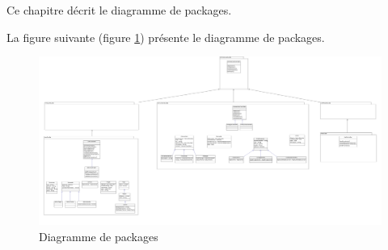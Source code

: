Ce chapitre décrit le diagramme de packages.

La figure suivante (figure \ref{diagrammePackages}) présente le diagramme de packages.
\begin{figure}[H]
	\centering
	\includegraphics[scale=0.12]{images/diagrammePackages/diagrammePackage.png}
	\caption{Diagramme de packages}
	\label{diagrammePackages}
\end{figure}